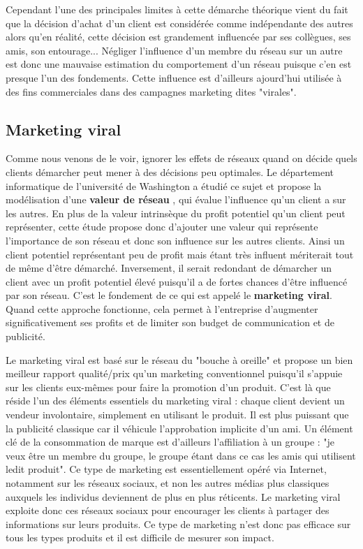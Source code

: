 Cependant l'une des principales limites à cette démarche théorique vient du fait que la décision d'achat d'un client est considérée comme indépendante des autres alors qu'en réalité, cette décision est grandement influencée par ses collègues, ses amis, son entourage... Négliger l'influence d'un membre du réseau sur un autre est donc une mauvaise estimation du comportement d'un réseau puisque c'en est presque l'un des fondements. Cette influence est d'ailleurs ajourd'hui utilisée à des fins commerciales dans des campagnes marketing dites "virales".


\subsection{Marketing viral}

Comme nous venons de le voir, ignorer les effets de réseaux quand on décide quels clients démarcher peut mener à des décisions peu optimales. Le département informatique de l'université de Washington a étudié ce sujet et propose la modélisation d'une \textbf{valeur de réseau} \cite{kdd01a}, qui évalue l'influence qu'un client a sur les autres. En plus de la valeur intrinsèque du profit potentiel qu'un client peut représenter, cette étude propose donc d'ajouter une valeur qui représente l'importance de son réseau et donc son influence sur les autres clients. Ainsi un client potentiel représentant peu de profit mais étant très influent mériterait tout de même d'être démarché. Inversement, il serait redondant de démarcher un client avec un profit potentiel élevé puisqu'il a de fortes chances d'être influencé par son réseau. C'est le fondement de ce qui est appelé le \textbf{marketing viral}. Quand cette approche fonctionne, cela permet à l'entreprise d'augmenter significativement ses profits et de limiter son budget de communication et de publicité.

Le marketing viral est basé sur le réseau du "bouche à oreille" et propose un bien meilleur rapport qualité/prix qu'un marketing conventionnel puisqu'il s'appuie sur les clients eux-mêmes pour faire la promotion d'un produit. C'est là que réside l'un des éléments essentiels du marketing viral : chaque client devient un vendeur involontaire, simplement en utilisant le produit. Il est plus puissant que la publicité classique car il véhicule l'approbation implicite d'un ami. Un élément clé de la consommation de marque est d'ailleurs l'affiliation à un groupe : "je veux être un membre du groupe, le groupe étant dans ce cas les amis qui utilisent ledit produit". Ce type de marketing est essentiellement opéré via Internet, notamment sur les réseaux sociaux, et non les autres médias plus classiques auxquels les individus deviennent de plus en plus réticents. Le marketing viral exploite donc ces réseaux sociaux pour encourager les clients à partager des informations sur leurs produits. Ce type de marketing n'est donc pas efficace sur tous les types produits et il est difficile de mesurer son impact.

